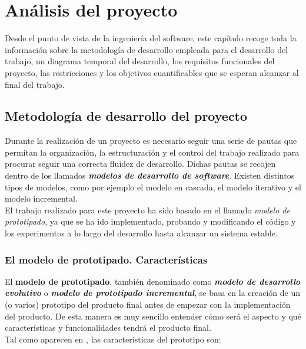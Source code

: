 
\chapter{Análisis del proyecto}

Desde el punto de vista de la ingeniería del software, este capítulo recoge toda la información sobre la metodología de desarrollo empleada para el desarrollo del trabajo, un diagrama temporal del desarrollo, los requisitos funcionales del proyecto, las restricciones y los objetivos cuantificables que se esperan alcanzar al final del trabajo.

\section{Metodología de desarrollo del proyecto}

Durante la realización de un proyecto es necesario seguir una serie de pautas que permitan la organización, la estructuración y el control del trabajo realizado para procurar seguir una correcta fluidez de desarrollo. Dichas pautas se recojen dentro de los llamados \textbf{\textit{modelos de desarrollo de software}}. Existen distintos tipos de modelos, como por ejemplo el modelo en cascada, el modelo iterativo y el modelo incremental. \\

El trabajo realizado para este proyecto ha sido basado en el llamado \textit{modelo de prototipado}, ya que se ha ido implementado, probando y modificando el código y los experimentos a lo largo del desarrollo hasta alcanzar un sistema estable. 

\subsection{El modelo de prototipado. Características}

El \textbf{modelo de prototipado}, también denominado como \textbf{\textit{modelo de desarrollo evolutivo}} o \textbf{\textit{modelo de prototipado incremental}}, se basa en la creación de un (o varios) prototipo del producto final antes de empezar con la implementación del producto. De esta manera es muy sencillo entender cómo será el aspecto y qué características y funcionalidades tendrá el producto final. \\

Tal como aparecen en \cite{modeloPrototpios}, las características del prototipo son: 

